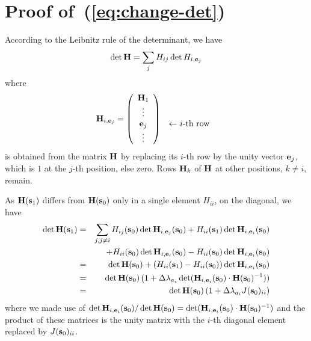 \documentclass[12pt]{article}
\newcommand{\bs}{{\bf s}}
\newcommand{\be}{{\bf e}}
\newcommand{\bH}{{\bf H}}
\begin{document}
\section{Proof of~(\ref{eq:change-det})}
\label{app:change-det}

According to the Leibnitz rule of the determinant, we have
\begin{equation}
\det \bH = \sum_j H_{ij} \det H_{i,\be_j}
\end{equation}
where
\begin{equation}
\bH_{i,\be_j} = \left( \begin{array}{c} \bH_1 \\ \vdots \\ \be_j \\ \vdots \end{array} \right)
                       \begin{array}{c}\phantom{\bH_1} \\ \phantom{\vdots} \\ \mbox{ $\leftarrow$ $i$-th row } \\ \phantom{\vdots} \end{array}
\end{equation}
is obtained from the matrix $\bH$ by replacing its $i$-th row by the unity vector $\be_j$, which is $1$ at the $j$-th position, else zero.
Rows $\bH_k$ of $\bH$ at other positions, $k \neq i$, remain.


As $\bH(\bs_1)$ differs from $\bH(\bs_0)$ only in a single element $H_{ii}$, on the diagonal, we have
\begin{eqnarray}
\det \bH(\bs_1)
 & = & \sum_{j, j\neq i} H_{ij}(\bs_0) \det \bH_{i,\be_j}(\bs_0) + H_{ii}(\bs_1) \det \bH_{i,\be_i}(\bs_0) \\
 &   &                 + H_{ii}(\bs_0) \det \bH_{i,\be_i}(\bs_0) - H_{ii}(\bs_0) \det \bH_{i,\be_i}(\bs_0) \\
 & = & \det \bH(\bs_0) + (H_{ii}(\bs_1) - H_{ii}(\bs_0)) \det \bH_{i,\be_i}(\bs_0) \\
 & = & \det \bH(\bs_0) \, (1 + \Delta \lambda_{a_i} \det ( \bH_{i,\be_i}(\bs_0) \cdot \bH(\bs_0)^{-1} )) \\
 & = & \det \bH(\bs_0) \, (1 + \Delta\lambda_{a_i} J(\bs_0)_{ii}) 
\end{eqnarray}
where we made use of $\det \bH_{i,\be_i}(\bs_0) / \det \bH(\bs_0) = \det (\bH_{i,\be_i}(\bs_0) \cdot \bH(\bs_0)^{-1})$
and the product of these matrices is the unity matrix with the $i$-th diagonal element replaced by $J(\bs_0)_{ii}$.
\end{document}
